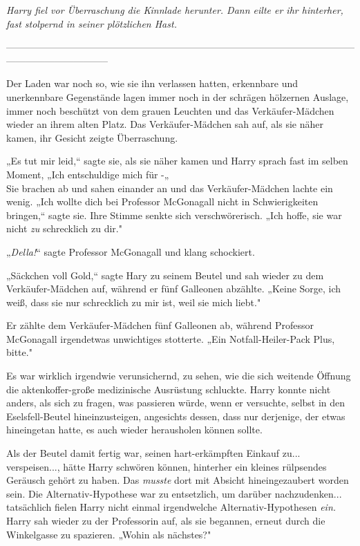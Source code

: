 {\emph{Harry fiel vor Überraschung die Kinnlade herunter. Dann eilte er ihr hinterher, fast stolpernd in seiner plötzlichen Hast.}

--------------------------------------------------------------------------------------------------------------------------------------------

\hfill\break Der Laden war noch so, wie sie ihn verlassen hatten, erkennbare und unerkennbare Gegenstände lagen immer noch in der schrägen hölzernen Auslage, immer noch beschützt von dem grauen Leuchten und das Verkäufer-Mädchen wieder an ihrem alten Platz. Das Verkäufer-Mädchen sah auf, als sie näher kamen, ihr Gesicht zeigte Überraschung.

„Es tut mir leid,“ sagte sie, als sie näher kamen und Harry sprach fast im selben Moment, „Ich entschuldige mich für -„\\ Sie brachen ab und sahen einander an und das Verkäufer-Mädchen lachte ein wenig. „Ich wollte dich bei Professor McGonagall nicht in Schwierigkeiten bringen,“ sagte sie. Ihre Stimme senkte sich verschwörerisch. „Ich hoffe, sie war nicht \emph{zu} schrecklich zu dir."

„\emph{Della!}“ sagte Professor McGonagall und klang schockiert.

„Säckchen voll Gold,“ sagte Hary zu seinem Beutel und sah wieder zu dem Verkäufer-Mädchen auf, während er fünf Galleonen abzählte. „Keine Sorge, ich weiß, dass sie nur schrecklich zu mir ist, weil sie mich liebt."

Er zählte dem Verkäufer-Mädchen fünf Galleonen ab, während Professor McGonagall irgendetwas unwichtiges stotterte. „Ein Notfall-Heiler-Pack Plus, bitte."

Es war wirklich irgendwie verunsichernd, zu sehen, wie die sich weitende Öffnung die aktenkoffer-große medizinische Ausrüstung schluckte. Harry konnte nicht anders, als sich zu fragen, was passieren würde, wenn er versuchte, selbst in den Eselsfell-Beutel hineinzusteigen, angesichts dessen, dass nur derjenige, der etwas hineingetan hatte, es auch wieder herausholen können sollte.

Als der Beutel damit fertig war, seinen hart-erkämpften Einkauf zu... verspeisen..., hätte Harry schwören können, hinterher ein kleines rülpsendes Geräusch gehört zu haben. Das \emph{musste} dort mit Absicht hineingezaubert worden sein. Die Alternativ-Hypothese war zu entsetzlich, um darüber nachzudenken... tatsächlich fielen Harry nicht einmal irgendwelche Alternativ-Hypothesen \emph{ein.} Harry sah wieder zu der Professorin auf, als sie begannen, erneut durch die Winkelgasse zu spazieren. „Wohin als nächstes?"

}
